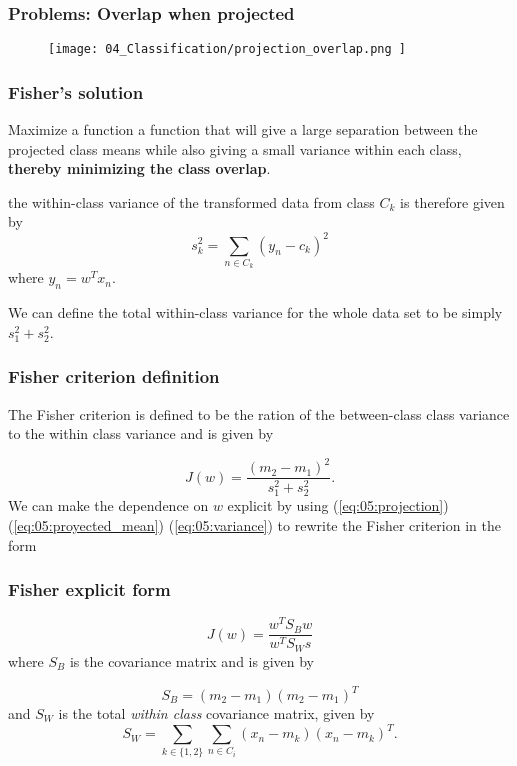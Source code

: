 \begin{frame}
    \frametitle{Problems: Overlap when projected}
\begin{figure}[t]
    \texttt{[image: 
        04\_Classification/projection\_overlap.png
    ]}
    \centering
\end{figure}

\end{frame}

\begin{frame}
    \frametitle{Fisher's solution}

    Maximize a function a function that will give a large separation between the projected
    class means while also giving a small variance within each class, \textbf{thereby minimizing the class overlap}. 

    the within-class variance of the transformed data
    from class $C_k$ is therefore given by
    \begin{equation}\label{eq:05:variance}
        s_k^2
        = 
        \sum_{n \in C_k}
        \left(
            y_n - c_k
        \right)^2
    \end{equation}
    where $y_n = w^T x_n$.

    We can define the total within-class variance for the whole data set to be simply $s_1^2 + s_2^2$. 
\end{frame}

\begin{frame}
    \frametitle{Fisher criterion definition }

    The Fisher criterion is defined to be the ration 
    of the between-class class variance to the 
    within class variance and is given by 

    \begin{equation}
        J(w)
        = 
        \frac{
            (m_2 - m_1)^2
        }{
            s_1^2 + s_2^2
        }.
    \end{equation}
    We can make the dependence on $w$ 
    explicit by using
    (\ref{eq:05:projection})
    (\ref{eq:05:proyected_mean})
    (\ref{eq:05:variance})
    to rewrite the Fisher criterion in the form
\end{frame}

\begin{frame}
    \frametitle{Fisher explicit form}

    
    \begin{equation}\label{eq:05:explicit}
        J(w)
        = 
        \frac{w^T S_B w}{w^T S_W s}
    \end{equation}
    where $S_B$ is the  covariance matrix and is given by 

    \begin{equation}\label{05:within-class-covariance}
        S_B = 
        (m_2 - m_1)
        (m_2 - m_1)^T
    \end{equation}
    and $S_W$ is the total \textit{within class} covariance matrix, given by
    \begin{equation}
        S_W
        = 
        \sum_{k \in \{1,2\}}
        \sum_{n \in C_i}
            (x_n - m_k)
            (x_n - m_k)^T.
    \end{equation}
\end{frame}


